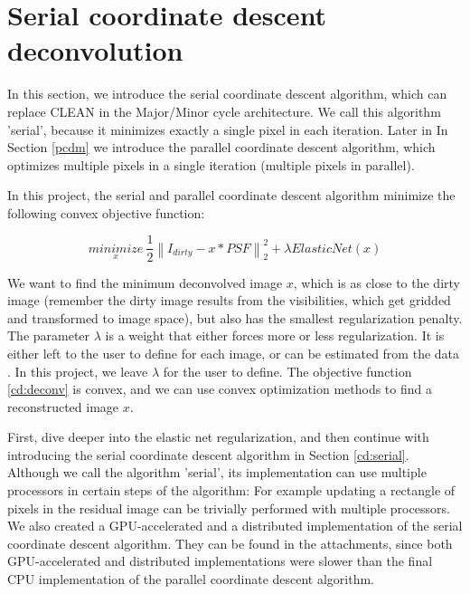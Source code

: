 \section{Serial coordinate descent deconvolution}\label{cd}
In this section, we introduce the serial coordinate descent algorithm, which can replace CLEAN in the Major/Minor cycle architecture. We call this algorithm 'serial', because it minimizes exactly a single pixel in each iteration. Later in In Section \ref{pcdm} we introduce the parallel coordinate descent algorithm, which optimizes multiple pixels in a single iteration (multiple pixels in parallel).

In this project, the serial and parallel coordinate descent algorithm minimize the following convex objective function:

\begin{equation}\label{cd:deconv}
\underset{x}{minimize} \: \frac{1}{2} \left \| I_{dirty} - x * PSF \right \|_2^2 + \lambda ElasticNet(x)
\end{equation}

We want to find the minimum deconvolved image $x$, which is as close to the dirty image (remember the dirty image results from the visibilities, which get gridded and transformed to image space), but also has the smallest regularization penalty. The parameter $\lambda$ is a weight that either forces more or less regularization. It is either left to the user to define for each image, or can be estimated from the data \cite{miller1970least}. In this project, we leave $\lambda$ for the user to define. The objective function \eqref{cd:deconv} is convex, and we can use convex optimization methods to find a reconstructed image $x$. 

First, dive deeper into the elastic net regularization, and then continue with introducing the serial coordinate descent algorithm in Section \ref{cd:serial}. Although we call the algorithm 'serial', its implementation can use multiple processors in certain steps of the algorithm: For example updating a rectangle of pixels in the residual image can be trivially performed with multiple processors. We also created a GPU-accelerated and a distributed implementation of the serial coordinate descent algorithm. They can be found in the attachments, since both GPU-accelerated and distributed implementations were slower than the final CPU implementation of the parallel coordinate descent algorithm.

